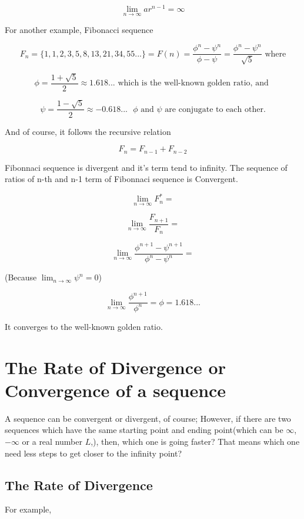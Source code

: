 \documentclass{article}
\begin{document}
  \[
	  \lim_{n \to \infty} ar^{n-1} = \infty
  \]

  For another example, Fibonacci sequence

  \[
	  F_n = \{1, 1, 2, 3, 5, 8, 13, 21, 34, 55...\} = F(n) = \dfrac{\phi^n - \psi^n}{\phi - \psi} = \dfrac{\phi^n - \psi^n}{\sqrt{5}} \text{ where}
  \]

  \[
	  \phi = \dfrac{1+\sqrt{5}}{2} \approx 1.618... \text{ which is the well-known golden ratio, and }
  \]

  \[
	  \psi = \dfrac{1-\sqrt{5}}{2} \approx -0.618... \text{ } \phi \text{ and } \psi \text{ are conjugate to each other.}
  \]

  And of course, it follows the recursive relation

  \[
	  F_n = F_{n-1} + F_{n-2}
  \]

  Fibonnaci sequence is divergent and it's term tend to infinity. The sequence of ratios of n-th and n-1 term of Fibonnaci sequence is Convergent.

  \[
	  \lim_{n \to \infty} F_n^* =
  \]

  \[
	  \lim_{n \to \infty} \dfrac{F_{n+1}}{F_n} = 
  \]

  \[
	  \lim_{n \to \infty} \dfrac{\phi^{n+1} - \psi^{n+1}}{\phi^n - \psi^n} = 
  \]

  \begin{center}
	  (Because $\displaystyle \lim_{n \to \infty} \psi^n = 0$)
  \end{center}

  \[
	  \lim_{n \to \infty} \dfrac{\phi^{n+1}}{\phi^n} = \phi = 1.618...
  \]

  It converges to the well-known golden ratio.

  \section{The Rate of Divergence or Convergence of a sequence}
  A sequence can be convergent or divergent, of course; However, if there are two sequences which have the same starting point and ending point(which can be $\infty$, $-\infty$ or a real number $L$,), then, which one is going faster? That means which one need less steps to get closer to the infinity point?

  \subsection{The Rate of Divergence}

  For example, 
\end{document}
